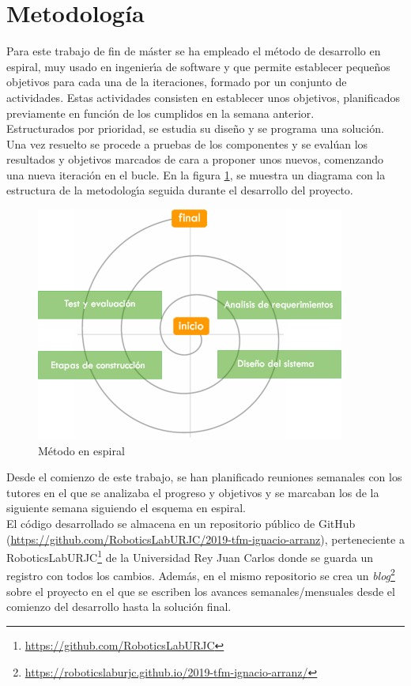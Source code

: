 \section{Metodología}

Para este trabajo de fin de máster se ha empleado el método de desarrollo en espiral, muy usado en ingenierı́a de software y que permite establecer pequeños objetivos para cada una de la iteraciones, formado por un conjunto de actividades. Estas actividades consisten en establecer unos objetivos, planificados previamente en función de los cumplidos en la semana anterior.\\

Estructurados por prioridad, se estudia su diseño y se programa una solución. Una vez resuelto se procede a pruebas de los componentes y se evalúan los resultados y objetivos marcados de cara a proponer unos nuevos, comenzando una nueva iteración en el bucle. En la figura \ref{fig:metodo_espiral}, se muestra un diagrama con la estructura de la metodologı́a seguida durante el desarrollo del proyecto.

\begin{figure}[!ht]
    \centering \includegraphics[width=0.6\columnwidth]{figures/chapter_1/metodo_espiral.png}
    \caption{
        \label{fig:metodo_espiral}
            Método en espiral
    }
\end{figure}

Desde el comienzo de este trabajo, se han planificado reuniones semanales con los tutores en el que se analizaba el progreso y objetivos y se marcaban los de la siguiente semana siguiendo el esquema en espiral.\\

El código desarrollado se almacena en un repositorio público de GitHub (\url{https://github.com/RoboticsLabURJC/2019-tfm-ignacio-arranz}), perteneciente a RoboticsLabURJC\footnote{\url{https://github.com/RoboticsLabURJC}} de la Universidad Rey Juan Carlos donde se guarda un registro con todos los cambios. Además, en el mismo repositorio se crea un \textit{blog}\footnote{\url{https://roboticslaburjc.github.io/2019-tfm-ignacio-arranz/}} sobre el proyecto en el que se escriben los avances semanales/mensuales desde el comienzo del desarrollo hasta la solución final.


